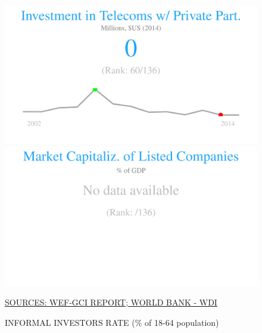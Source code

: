 \documentclass{article}\usepackage[]{graphicx}\usepackage[]{color}
\makeatletter
\def\maxwidth{ %
  \ifdim\Gin@nat@width>\linewidth
    \linewidth
  \else
    \Gin@nat@width
  \fi
}
\makeatother
\begin{document}
\begin{figure}
\begin{minipage}[c]{0.95\textwidth}
\begin{minipage}[c]{0.95\textwidth}
\begin{minipage}[c]{0.32\textwidth}
{\centering \includegraphics[width=\maxwidth]{figure/figure_sparkline_Fin2-1} 

}



      \end{minipage}
      \begin{minipage}[c]{0.32\textwidth}


{\centering \includegraphics[width=\maxwidth]{figure/figure_sparkline_Fin3-1} 

}



      \end{minipage}
       \hspace{4ex}\scriptsize{\href{http://reports.weforum.org/global-competitiveness-index/}{\textcolor[HTML]{22A6F5}{SOURCES: WEF-GCI REPORT; }}\href{http://data.worldbank.org}{\textcolor[HTML]{22A6F5}{WORLD BANK - WDI}}}
  \end{minipage}
    
  \begin{minipage}[c]{0.95\textwidth} %
    \vspace*{0.6cm}
    \begin{minipage}[c]{0.49\textwidth} %
      \small{\textcolor[HTML]{818181}{INFORMAL INVESTORS RATE \footnotesize(\% of 18-64 population)}}



\end{minipage}
\end{minipage}
\end{minipage}
\end{figure}
\end{document}
